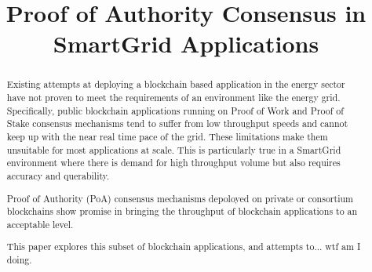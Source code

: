 \documentclass[conference]{IEEEtran}
\begin{document}
\title{Proof of Authority Consensus in SmartGrid Applications}
\author{
  }

		



\maketitle

\IEEEoverridecommandlockouts
{}
\maketitle
\IEEEpubidadjcol

\begin{abstract}

Existing attempts at deploying a blockchain based application in the energy sector have not proven to meet the requirements
of an environment like the energy grid. Specifically, public blockchain applications running on Proof of Work 
and Proof of Stake consensus mechanisms tend to suffer from low 
throughput speeds and cannot keep up with the near real time pace of the grid. 
These limitations make them unsuitable for most applications at scale. This 
is particularly true in a SmartGrid environment where there is demand for high throughput volume but also requires 
accuracy and querability.

Proof of Authority (PoA) consensus mechanisms depoloyed on private or consortium blockchains show promise in
bringing the throughput of blockchain applications to an acceptable level. 

This paper explores this subset of 
blockchain applications, and attempts to... wtf am I doing. 


\end{abstract}
\end{document}
